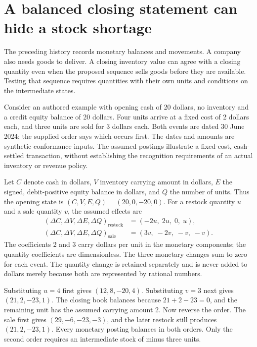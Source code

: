 \section{A balanced closing statement can hide a stock shortage}
\label{sec:typed-economic-history}

The preceding history records monetary balances and movements. A company also
needs goods to deliver. A closing inventory value can agree with a closing
quantity even when the proposed sequence sells goods before they are available.
Testing that sequence requires quantities with their own units and conditions
on the intermediate states.

Consider an authored example with opening cash of 20 dollars, no inventory and
a credit equity balance of 20 dollars. Four units arrive at a fixed cost of
2 dollars each, and three units are sold for 3 dollars each. Both events are
dated 30 June 2024; the supplied order says which occurs first. The dates and
amounts are synthetic conformance inputs. The assumed postings illustrate a
fixed-cost, cash-settled transaction, without establishing the recognition
requirements of an actual inventory or revenue policy.

Let \(C\) denote cash in dollars, \(V\) inventory carrying amount in dollars,
\(E\) the signed, debit-positive equity balance in dollars, and \(Q\) the
number of units. Thus the opening state is
\((C,V,E,Q)=(20,0,-20,0)\). For a restock quantity \(u\) and a sale
quantity \(v\), the assumed effects are
\begin{align}
\label{eq:typed-stock-effects}
 (\Delta C,\Delta V,\Delta E,\Delta Q)_{\mathrm{restock}}
   &=(-2u,\;2u,\;0,\;u),\\
 (\Delta C,\Delta V,\Delta E,\Delta Q)_{\mathrm{sale}}
   &=(3v,\;-2v,\;-v,\;-v).
\end{align}
The coefficients 2 and 3 carry dollars per unit in the monetary components;
the quantity coefficients are dimensionless. The three monetary changes sum
to zero for each event. The quantity change is retained separately and is
never added to dollars merely because both are represented by rational numbers.

Substituting \(u=4\) first gives \((12,8,-20,4)\). Substituting \(v=3\)
next gives \((21,2,-23,1)\). The closing book balances because
\(21+2-23=0\), and the remaining unit has the assumed carrying amount 2.
Now reverse the order. The sale first gives \((29,-6,-23,-3)\), and the
later restock still produces \((21,2,-23,1)\). Every monetary posting
balances in both orders. Only the second order requires an intermediate stock
of minus three units.

